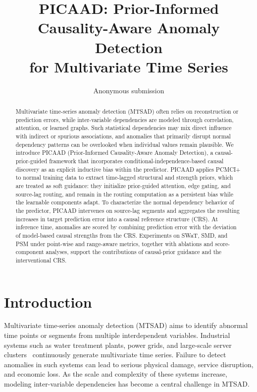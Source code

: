 \documentclass[letterpaper]{article}
\title{PICAAD: Prior-Informed Causality-Aware Anomaly Detection\\for Multivariate Time Series}
\author{Anonymous submission}
\begin{document}
\maketitle

\begin{abstract}
Multivariate time-series anomaly detection (MTSAD) often relies on reconstruction or prediction errors, while inter-variable dependencies are modeled through correlation, attention, or learned graphs. Such statistical dependencies may mix direct influence with indirect or spurious associations, and anomalies that primarily disrupt normal dependency patterns can be overlooked when individual values remain plausible. We introduce PICAAD (Prior-Informed Causality-Aware Anomaly Detection), a causal-prior-guided framework that incorporates conditional-independence-based causal discovery as an explicit inductive bias within the predictor. PICAAD applies PCMCI+ to normal training data to extract time-lagged structural and strength priors, which are treated as soft guidance: they initialize prior-guided attention, edge gating, and source-lag routing, and remain in the routing computation as a persistent bias while the learnable components adapt. To characterize the normal dependency behavior of the predictor, PICAAD intervenes on source-lag segments and aggregates the resulting increases in target prediction error into a causal reference structure (CRS). At inference time, anomalies are scored by combining prediction error with the deviation of model-based causal strengths from the CRS. Experiments on SWaT, SMD, and PSM under point-wise and range-aware metrics, together with ablations and score-component analyses, support the contributions of causal-prior guidance and the interventional CRS.
\end{abstract}

\section{Introduction}

Multivariate time-series anomaly detection (MTSAD) aims to identify abnormal time points or segments from multiple interdependent variables. Industrial systems such as water treatment plants, power grids, and large-scale server clusters~\cite{goh2017swat,su2019omni} continuously generate multivariate time series. Failure to detect anomalies in such systems can lead to serious physical damage, service disruption, and economic loss. As the scale and complexity of these systems increase, modeling inter-variable dependencies has become a central challenge in MTSAD.
\end{document}

